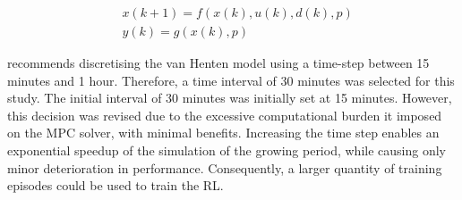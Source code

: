 \begin{equation}\label{eq:greenhouse_model_discrete}
	\begin{aligned}
		& x(k+1) = f(x(k),u(k),d(k),p) \\
		& y(k) = g(x(k),p)
	\end{aligned}
\end{equation}

\cite{vanstratenUserAcceptedOptimal2000} recommends discretising the van Henten model using a time-step between 15 minutes and 1 hour. Therefore, a time interval of 30 minutes was selected for this study. 
The initial interval of 30 minutes was initially set at 15 minutes. However, this decision was revised due to the excessive computational burden it imposed on the MPC solver, with minimal benefits. Increasing the time step enables an exponential speedup of the simulation of the growing period, while causing only minor deterioration in performance. Consequently, a larger quantity of training episodes could be used to train the RL.



